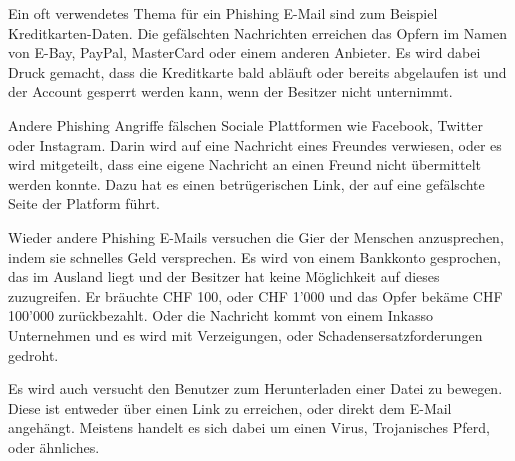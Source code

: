 Ein oft verwendetes Thema für ein Phishing E-Mail sind zum Beispiel Kreditkarten-Daten. Die gefälschten Nachrichten erreichen das Opfern im Namen von E-Bay, PayPal, MasterCard oder einem anderen Anbieter. Es wird dabei Druck gemacht, dass die Kreditkarte bald abläuft oder bereits abgelaufen ist und der Account gesperrt werden kann, wenn der Besitzer nicht unternimmt.

Andere Phishing Angriffe fälschen Sociale Plattformen wie Facebook, Twitter oder Instagram. Darin wird auf eine Nachricht eines Freundes verwiesen, oder es wird mitgeteilt, dass eine eigene Nachricht an einen Freund nicht übermittelt werden konnte. Dazu hat es einen betrügerischen Link, der auf eine gefälschte Seite der Platform führt.

Wieder andere Phishing E-Mails versuchen die Gier der Menschen anzusprechen, indem sie schnelles Geld versprechen. Es wird von einem Bankkonto gesprochen, das im Ausland liegt und der Besitzer hat keine Möglichkeit auf dieses zuzugreifen. Er bräuchte CHF 100, oder CHF 1'000 und das Opfer bekäme CHF 100'000 zurückbezahlt. Oder die Nachricht kommt von einem Inkasso Unternehmen und es wird mit Verzeigungen, oder Schadensersatzforderungen gedroht.

Es wird auch versucht den Benutzer zum Herunterladen einer Datei zu bewegen. Diese ist entweder über einen Link zu erreichen, oder direkt dem E-Mail angehängt. Meistens handelt es sich dabei um einen Virus, Trojanisches Pferd, oder ähnliches. 

